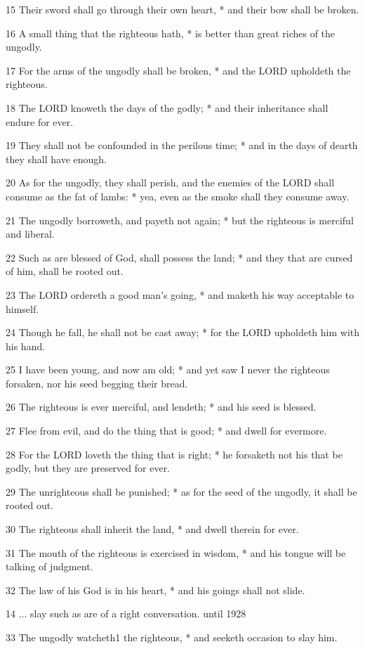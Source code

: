 15 Their sword shall go through their own heart, * and
their bow shall be broken.

16 A small thing that the righteous hath, * is better
than great riches of the ungodly.

17 For the arms of the ungodly shall be broken, * and
the LORD upholdeth the righteous.

18 The LORD knoweth the days of
the godly; * and their inheritance shall endure for ever.

19 They shall not be confounded in the perilous time;
* and in the days of dearth they shall have enough.

20 As for the ungodly, they shall perish, and the enemies
of the LORD shall consume as the fat of lambs: *
yea, even as the smoke shall they consume away.

21 The ungodly borroweth, and payeth not again; * but
the righteous is merciful and liberal.

22 Such as are blessed of God, shall possess the land;
* and they that are cursed of him, shall be rooted out.

23 The LORD ordereth a good man's
going, * and maketh his way acceptable to himself.

24 Though he fall, he shall not be cast away; * for the
LORD upholdeth him with his hand.

25 I have been young, and now am old; * and yet saw I
never the righteous forsaken, nor his seed begging their bread.

26 The righteous is ever merciful, and lendeth; * and
his seed is blessed.

27 Flee from evil, and do the thing that is good; * and
dwell for evermore.

28 For the LORD loveth the thing
that is right; * he forsaketh not his that be godly, but they are preserved
for ever.

29 The unrighteous shall be punished; * as for the seed
of the ungodly, it shall be rooted out.

30 The righteous shall inherit the land, * and dwell
therein for ever.

31 The mouth of the righteous is exercised in wisdom,
* and his tongue will be talking of judgment.

32 The law of his God is in his heart, * and his goings
shall not slide.

14 ... slay such as are of a right conversation. until
1928

33 The ungodly watcheth1 the righteous,
* and seeketh occasion to slay him.

